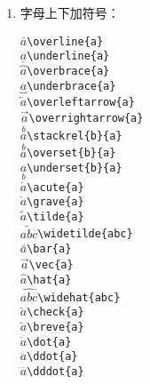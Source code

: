 \documentclass{article}
\newcommand{\q}{\quad}
\begin{document}
\begin{multicols}{2}
\begin{enumerate}
        \item 字母上下加符号：
              \vspace{-4mm}
              \begin{multicols}{2}
                  $ \overline{a} $\q \verb|\overline{a}| \\
                  $ \underline{a} $\q \verb|\underline{a}| \\
                  $ \overbrace{a} $\q \verb|\overbrace{a}| \\
                  $ \underbrace{a} $\q \verb|\underbrace{a}| \\
                  $ \overleftarrow{a} $\q \verb|\overleftarrow{a}| \\
                  $ \overrightarrow{a} $\q \verb|\overrightarrow{a}| \\
                  $ \stackrel{b}{a} $\q \verb|\stackrel{b}{a}| \\
                  $ \overset{b}{a} $\q \verb|\overset{b}{a}| \\
                  $ \underset{b}{a} $\q \verb|\underset{b}{a}| \\
                  $ \acute{a} $\q \verb|\acute{a}| \\
                  $ \grave{a} $\q \verb|\grave{a}| \\
                  $ \tilde{a} $\q \verb|\tilde{a}| \\
                  $ \widetilde{abc} $\q \verb|\widetilde{abc}| \\
                  $ \bar{a} $\q \verb|\bar{a}| \\
                  $ \vec{a} $\q \verb|\vec{a}| \\
                  $ \hat{a} $\q \verb|\hat{a}| \\
                  $ \widehat{abc} $\q \verb|\widehat{abc}| \\
                  $ \check{a} $\q \verb|\check{a}| \\
                  $ \breve{a} $\q \verb|\breve{a}| \\
                  $ \dot{a} $\q \verb|\dot{a}| \\
                  $ \ddot{a} $\q \verb|\ddot{a}| \\
                  $ \dddot{a} $\q \verb|\dddot{a}|
              \end{multicols}
              \vspace{-4mm}


\end{enumerate}
\end{multicols}
\end{document}
